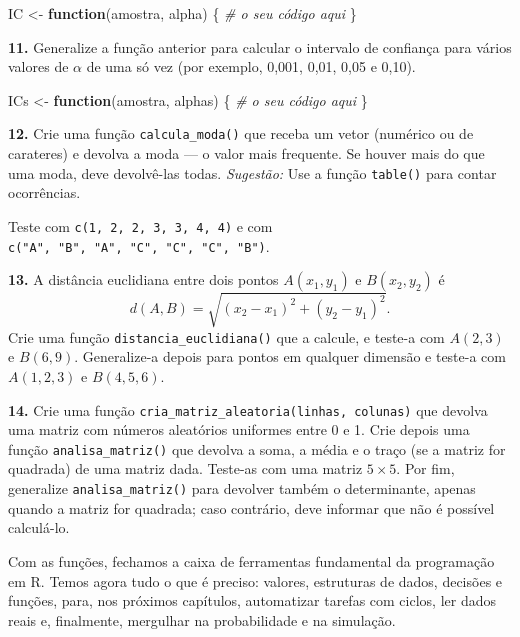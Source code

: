 \documentclass[
  portuguese,
  11pt,
  openany]{book}
\newenvironment{Shaded}{\begin{snugshade}}{\end{snugshade}}
\newcommand{\CommentTok}[1]{\textcolor[rgb]{0.56,0.35,0.01}{\textit{#1}}}
\newcommand{\ControlFlowTok}[1]{\textcolor[rgb]{0.13,0.29,0.53}{\textbf{#1}}}
\newcommand{\NormalTok}[1]{#1}
\newcommand{\OtherTok}[1]{\textcolor[rgb]{0.56,0.35,0.01}{#1}}
\begin{document}
\begin{Shaded}
\begin{Highlighting}[]
\NormalTok{IC }\OtherTok{\textless{}{-}} \ControlFlowTok{function}\NormalTok{(amostra, alpha) \{}
  \CommentTok{\# o seu código aqui}
\NormalTok{\}}
\end{Highlighting}
\end{Shaded}

\textbf{11.} Generalize a função anterior para calcular o intervalo de confiança para
vários valores de \(\alpha\) de uma só vez (por exemplo, 0,001, 0,01, 0,05 e 0,10).

\begin{Shaded}
\begin{Highlighting}[]
\NormalTok{ICs }\OtherTok{\textless{}{-}} \ControlFlowTok{function}\NormalTok{(amostra, alphas) \{}
  \CommentTok{\# o seu código aqui}
\NormalTok{\}}
\end{Highlighting}
\end{Shaded}

\textbf{12.} Crie uma função \texttt{calcula\_moda()} que receba um vetor (numérico ou de
carateres) e devolva a moda --- o valor mais frequente. Se houver mais do que uma
moda, deve devolvê-las todas.
\emph{Sugestão:} Use a função \texttt{table()} para contar ocorrências.

Teste com \texttt{c(1,\ 2,\ 2,\ 3,\ 3,\ 4,\ 4)} e com \texttt{c("A",\ "B",\ "A",\ "C",\ "C",\ "C",\ "B")}.

\textbf{13.} A distância euclidiana entre dois pontos \(A(x_1, y_1)\) e \(B(x_2, y_2)\) é
\[d(A, B) = \sqrt{(x_2 - x_1)^2 + (y_2 - y_1)^2}.\]
Crie uma função \texttt{distancia\_euclidiana()} que a calcule, e teste-a com \(A(2, 3)\) e
\(B(6, 9)\). Generalize-a depois para pontos em qualquer dimensão e teste-a com
\(A(1, 2, 3)\) e \(B(4, 5, 6)\).

\textbf{14.} Crie uma função \texttt{cria\_matriz\_aleatoria(linhas,\ colunas)} que devolva uma
matriz com números aleatórios uniformes entre 0 e 1. Crie depois uma função
\texttt{analisa\_matriz()} que devolva a soma, a média e o traço (se a matriz for
quadrada) de uma matriz dada. Teste-as com uma matriz \(5 \times 5\). Por fim,
generalize \texttt{analisa\_matriz()} para devolver também o determinante, apenas quando a
matriz for quadrada; caso contrário, deve informar que não é possível calculá-lo.

Com as funções, fechamos a caixa de ferramentas fundamental da programação em R.
Temos agora tudo o que é preciso: valores, estruturas de dados, decisões e
funções, para, nos próximos capítulos, automatizar tarefas com ciclos, ler dados
reais e, finalmente, mergulhar na probabilidade e na simulação.
\end{document}
